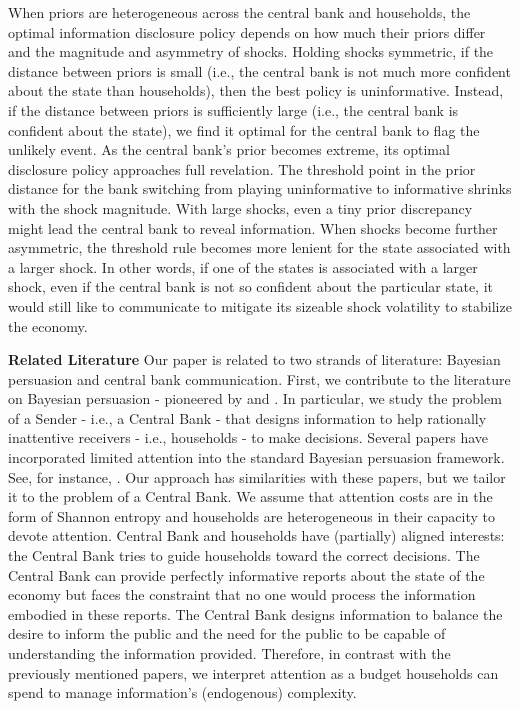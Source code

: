 \documentclass[12pt,a4paper]{article}
\begin{document}
When priors are heterogeneous across the central bank and households, the optimal information disclosure policy depends on how much their priors differ and the magnitude and asymmetry of shocks. 
Holding shocks symmetric, if the distance between priors is small (i.e., the central bank is not much more confident about the state than households), then the best policy is uninformative. Instead, if the distance between priors is sufficiently large (i.e., the central bank is confident about the state), we find it optimal for the central bank to flag the unlikely event. As the central bank's prior becomes extreme, its optimal disclosure policy approaches full revelation. The threshold point in the prior distance for the bank switching from playing uninformative to informative shrinks with the shock magnitude. With large shocks, even a tiny prior discrepancy might lead the central bank to reveal information. When shocks become further asymmetric, the threshold rule becomes more lenient for the state associated with a larger shock. In other words, if one of the states is associated with a larger shock, even if the central bank is not so confident about the particular state, it would still like to communicate to mitigate its sizeable shock volatility to stabilize the economy.

\noindent\textbf{Related Literature} Our paper is related to two strands of literature: Bayesian persuasion and central bank communication. First, we contribute to the literature on Bayesian persuasion - pioneered by \cite{aumann1995repeated} and \cite{KG2011}. In particular, we study the problem of a Sender - i.e., a Central Bank - that designs information to help rationally inattentive \citep{Sims2003} receivers - i.e., households - to make decisions. Several papers have incorporated limited attention into the standard Bayesian persuasion framework. See, for instance, \cite{Bloedel2020,Lipnowski2020,lipnowski2022,Wei2021,Matyskova2021,innocenti2022can}. Our approach has similarities with these papers, but we tailor it to the problem of a Central Bank. We assume that attention costs are in the form of Shannon entropy and households are heterogeneous in their capacity to devote attention. Central Bank and households have (partially) aligned interests: the Central Bank tries to guide households toward the correct decisions. The Central Bank can provide perfectly informative reports about the state of the economy but faces the constraint that no one would process the information embodied in these reports. The Central Bank designs information to balance the desire to inform the public and the need for the public to be capable of understanding the information provided. Therefore, in contrast with the previously mentioned papers, we interpret attention as a budget households can spend to manage information's (endogenous) complexity.
\end{document}
